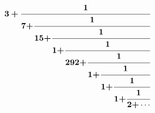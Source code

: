 \documentclass{article}
\begin{document}
\thispagestyle{empty}
\pagecolor{mycol}
\[
\mathbf{3}\bm{+}\cfrac{\mathbf{1}}{\mathbf{7\bm{+}}\cfrac{\mathbf{1}}{\mathbf{15\bm{+}}\cfrac{\mathbf{1}}{\mathbf{1\bm{+}}\cfrac{\mathbf{1}}{\mathbf{292\bm{+}}\cfrac{\mathbf{1}}{\mathbf{1\bm{+}}\cfrac{\mathbf{1}}{\mathbf{1\bm{+}}\cfrac{\mathbf{1}}{\mathbf{1\bm{+}}\cfrac{\mathbf{1}}{\mathbf{2\bm{+}}\cdots}}}}}}}}
\]
\end{document}
